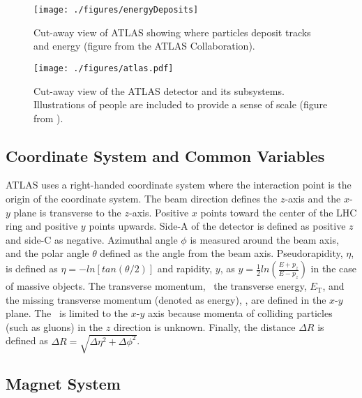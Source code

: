 \begin{figure}[h!]
  \centering
	\texttt{[image: ./figures/energyDeposits]}
\caption[Cut-away view of ATLAS showing where particles deposit tracks and energy]{\label{fig:energyDeposits}{ Cut-away view of ATLAS showing where particles deposit tracks and energy (figure from the ATLAS Collaboration). }} %
\end{figure}


\begin{figure}[h!]
  \centering
	\texttt{[image: ./figures/atlas.pdf]}
\caption[Cut-away view of the ATLAS detector and its subsystems]{\label{fig:atlas}{ Cut-away view of the ATLAS detector and its subsystems.  Illustrations of people are included to provide a sense of scale (figure from \cite{DetectorPaper:2008}). }} %
\end{figure}


\subsection{Coordinate System and Common Variables}

ATLAS uses a right-handed coordinate system where the interaction point is the origin of the coordinate system.  The beam direction defines the $z$-axis and the $x$-$y$ plane is transverse to the $z$-axis.  Positive $x$ points toward the center of the LHC ring and positive $y$ points upwards.  Side-A of the detector is defined as positive $z$ and side-C as negative.  Azimuthal angle $\phi$ is measured around the beam axis, and the polar angle $\theta$ defined as the angle from the beam axis.  Pseudorapidity, $\eta$, is defined as $\eta = -ln[tan(\theta/2)]$ and rapidity, $y$, as $y=\frac{1}{2} ln(\frac{E+p_{z}}{E-p_{z}})$ in the case of massive objects.  The transverse momentum, \pt\,  the transverse energy, $E_{\mathrm{T}}$, and the missing transverse momentum (denoted as energy), \met, are defined in the $x$-$y$ plane.  The \met\ is limited to the $x$-$y$ axis because momenta of colliding particles (such as gluons) in the $z$ direction is unknown.  Finally, the distance $\Delta R$ is defined as $\Delta R = \sqrt{\Delta\eta^{2} + \Delta\phi^{2}}$.\\

\subsection{Magnet System}

